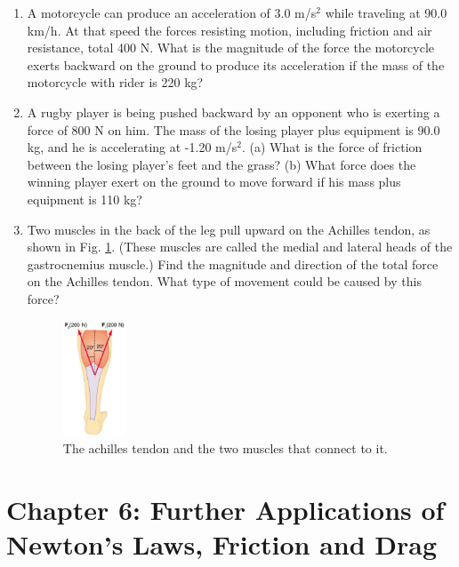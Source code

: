 \documentclass[10pt]{article}
\begin{document}
\begin{enumerate}
\item A motorcycle can produce an acceleration of 3.0 m/s$^2$ while traveling at 90.0 km/h. At that speed the forces resisting motion, including friction and air resistance, total 400 N.  What is the magnitude of the force the motorcycle exerts backward on the ground to produce its acceleration if the mass of the motorcycle with rider is 220 kg? \\ \vspace{2.5cm}
\item A rugby player is being pushed backward by an opponent who is exerting a force of 800 N on him.  The mass of the losing player plus equipment is 90.0 kg, and he is accelerating at -1.20 m/s$^2$.  (a) What is the force of friction between the losing player’s feet and the grass? (b) What force does the winning player exert on the ground to move forward if his mass plus equipment is 110 kg? \\ \vspace{2.5cm}
\item Two muscles in the back of the leg pull upward on the Achilles tendon, as shown in Fig. \ref{fig:muscle}. (These muscles are called the medial and lateral heads of the gastrocnemius muscle.) Find the magnitude and direction of the total force on the Achilles tendon.  What type of movement could be caused by this force? \\ \vspace{1cm}
\begin{figure}[hb]
\centering
\includegraphics[width=0.175\textwidth]{figures/muscle.png}
\caption{\label{fig:muscle} The achilles tendon and the two muscles that connect to it.}
\end{figure}
\end{enumerate}

\section{Chapter 6: Further Applications of Newton's Laws, Friction and Drag}
\end{document}
